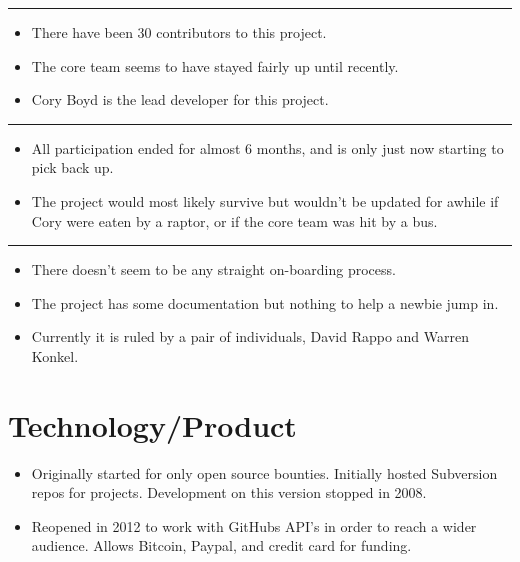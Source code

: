 \begin{center}\rule{3in}{0.4pt}\end{center}

\begin{itemize}
\itemsep1pt\parskip0pt
\item
  There have been 30 contributors to this project.
\item
  The core team seems to have stayed fairly up until recently.
\item
  Cory Boyd is the lead developer for this project.
\end{itemize}

\begin{center}\rule{3in}{0.4pt}\end{center}

\begin{itemize}
\itemsep1pt\parskip0pt
\item
  All participation ended for almost 6 months, and is only just now
  starting to pick back up.
\item
  The project would most likely survive but wouldn't be updated for
  awhile if Cory were eaten by a raptor, or if the core team was hit by
  a bus.
\end{itemize}

\begin{center}\rule{3in}{0.4pt}\end{center}

\begin{itemize}
\itemsep1pt\parskip0pt
\item
  There doesn't seem to be any straight on-boarding process.
\item
  The project has some documentation but nothing to help a newbie jump
  in.
\item
  Currently it is ruled by a pair of individuals, David Rappo and Warren
  Konkel.
\end{itemize}

\section{Technology/Product}\label{technologyproduct}

\begin{itemize}
\itemsep1pt\parskip0pt
\item
  Originally started for only open source bounties. Initially hosted
  Subversion repos for projects. Development on this version stopped in
  2008.
\item
  Reopened in 2012 to work with GitHubs API's in order to reach a wider
  audience. Allows Bitcoin, Paypal, and credit card for funding.
\end{itemize}
